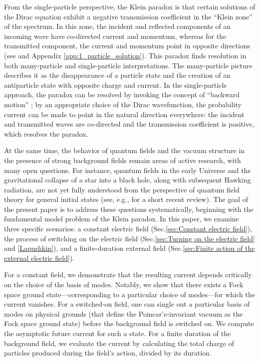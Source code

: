\documentclass[12pt]{article}
\numberwithin{equation}{section}
\begin{document}
From the single-particle perspective, the Klein paradox is that certain solutions of the Dirac equation exhibit a negative transmission coefficient in the ``Klein zone'' of the spectrum. In this zone, the incident and reflected components of an incoming wave have co-directed current and momentum, whereas for the transmitted component, the current and momentum point in opposite directions (see \cite{ternov2024paradoks15483} and Appendix \ref{app:1_particle_solution}). This paradox finds resolution in both many-particle and single-particle interpretations. The many-particle picture describes it as the disappearance of a particle state and the creation of an antiparticle state with opposite charge and current. In the single-particle approach, the paradox can be resolved by invoking the concept of ``backward motion'' \cite{ternov2024paradoks15483}; by an appropriate choice of the Dirac wavefunction, the probability current can be made to point in the natural direction everywhere: the incident and transmitted waves are co-directed and the transmission coefficient is positive, which resolves the paradox.

At the same time, the behavior of quantum fields and the vacuum structure in the presence of strong background fields remain areas of active research, with many open questions. For instance, quantum fields in the early Universe and the gravitational collapse of a star into a black hole, along with subsequent Hawking radiation, are not yet fully understood from the perspective of quantum field theory for general initial states (see, e.g., \cite{Akhmedov:2021rhq} for a short recent review). The goal of the present paper is to address these questions systematically, beginning with the fundamental model problem of the Klein paradox. In this paper, we examine three specific scenarios: a constant electric field (Sec.\ref{sec:Constant electric field}), the process of switching on the electric field (Sec.\ref{sec:Turning on the electric field} and \ref{Lapushkin}), and a finite-duration external field (Sec.\ref{sec:Finite action of the external electric field}).

For a constant field, we demonstrate that the resulting current depends critically on the choice of the basis of modes. Notably, we show that there exists a Fock space ground state—corresponding to a particular choice of modes—for which the current vanishes. For a switched-on field, one can single out a particular basis of modes on physical grounds (that define the Poincar'e-invariant vacuum as the Fock space ground state) before the background field is switched on. We compute the asymptotic future current for such a state. For a finite duration of the background field, we evaluate the current by calculating the total charge of particles produced during the field's action, divided by its duration.
\end{document}

